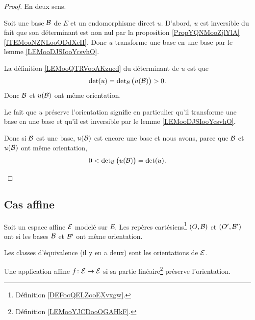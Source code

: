 \begin{proof}
    En deux sens.
    \begin{subproof}
        \item[Direct implique préserve l'orientation]
            Soit une base \( \mathcal{B}\) de \( E\) et un endomorphisme direct \( u\). D'abord, \( u\) est inversible du fait que son déterminant est non nul par la proposition \ref{PropYQNMooZjlYlA}\ref{ITEMooNZNLooODdXeH}. Donc \( u\) transforme une base en une base par le lemme \ref{LEMooDJSIooYcsvhO}.

            La définition \ref{LEMooQTRVooAKzucd} du déterminant de \( u\) est que
            \begin{equation}
                \mathop{\mathrm{det}}\nolimits(u)=\mathop{\mathrm{det}}\nolimits_{\mathcal{B}}\big( u(\mathcal{B}) \big)>0.
            \end{equation}
            Donc \( \mathcal{B}\) et \( u(\mathcal{B})\) ont même orientation.
        \item[Préserve l'orientation implique direct]
            Le fait que \( u\) préserve l'orientation signifie en particulier qu'il transforme une base en une base et qu'il est inversible par le lemme \ref{LEMooDJSIooYcsvhO}.

            Donc si \( \mathcal{B}\) est une base, \( u(\mathcal{B})\) est encore une base et nous avons, parce que \( \mathcal{B}\) et \( u(\mathcal{B})\) ont même orientation,
            \begin{equation}
                0<\mathop{\mathrm{det}}\nolimits_{\mathcal{B}}\big( u(\mathcal{B}) \big)=\mathop{\mathrm{det}}\nolimits(u).
            \end{equation}
    \end{subproof}
\end{proof}

\subsection{Cas affine}

\begin{definition}      \label{DEFooOTFPooIVkHFP}
    Soit un espace affine \( \mathcal{E}\) modelé sur \( E\). Les repères cartésiens\footnote{Définition \ref{DEFooQELZooEXvxgw}.} \( (O,\mathcal{B})\) et \( (O',\mathcal{B}')\) ont  si les bases \( \mathcal{B}\) et \( \mathcal{B}'\) ont même orientation.

    Les classes d'équivalence (il y en a deux) sont les orientations de \( \mathcal{E}\).

Une application affine \( f\colon \mathcal{E}\to \mathcal{E}\)  si sa partie linéaire\footnote{Définition \ref{LEMooYJCDooOGAHkF}.} préserve l'orientation.
\end{definition}


